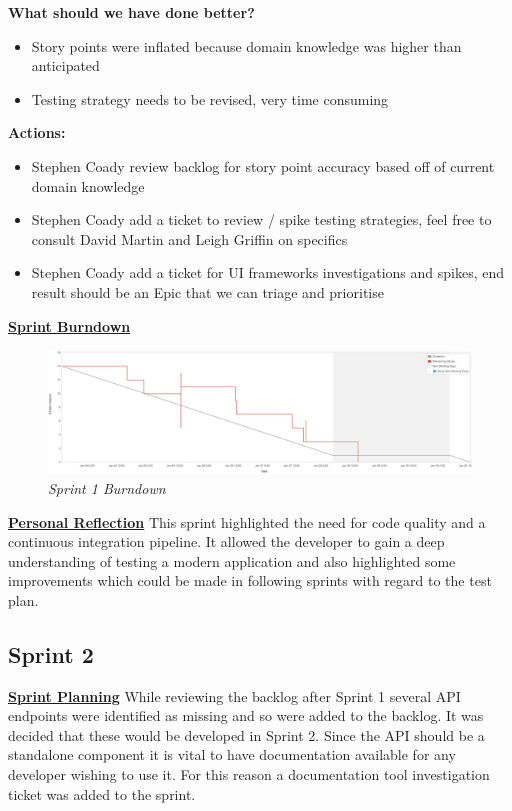 \textbf{What should we have done better?}
\begin{itemize}
	\item Story points were inflated because domain knowledge was higher than anticipated
	\item Testing strategy needs to be revised, very time consuming
\end{itemize}

\textbf{Actions:}
\begin{itemize}
	\item Stephen Coady review backlog for story point accuracy based off of current domain knowledge
	\item Stephen Coady add a ticket to review / spike testing strategies, feel free to consult David Martin and Leigh Griffin on specifics
	\item Stephen Coady add a ticket for UI frameworks investigations and spikes, end result should be an Epic that we can triage and prioritise
\end{itemize}

\underline{\textbf{Sprint Burndown}}\newline
\begin{figure}[!ht]
\centering
\includegraphics*[width=\textwidth]{images/sprint1}
\caption{\em Sprint 1 Burndown}
\label{fig:sprint1}
\end{figure}

\underline{\textbf{Personal Reflection}}\newline
This sprint highlighted the need for code quality and a continuous integration pipeline. It allowed the developer to gain a deep understanding of testing a modern application and also highlighted some improvements which could be made in following sprints with regard to the test plan.


\subsection{Sprint 2}
\underline{\textbf{Sprint Planning}}\newline
While reviewing the backlog after Sprint 1 several API endpoints were identified as missing and so were added to the backlog. It was decided that these would be developed in Sprint 2. Since the API should be a standalone component it is vital to have documentation available for any developer wishing to use it. For this reason a documentation tool investigation ticket was added to the sprint.

